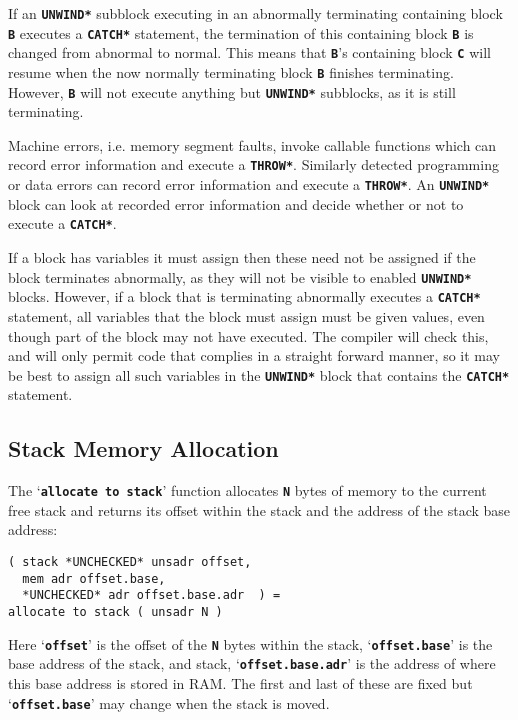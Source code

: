 \documentclass[12pt]{article}
\makeatletter
\newcommand{\TT}[1]{{\tt \bfseries #1}}
\newcommand{\ttkey}[1]{\TT{#1}\index{#1@{\tt #1}}}
\newenvironment{indpar}[1][0.3in]%
	{\begin{list}{}%
		     {\setlength{\itemsep}{0in}%
		      \setlength{\topsep}{0in}%
		      \setlength{\parsep}{1ex}%
		      \setlength{\labelwidth}{#1}%
		      \setlength{\leftmargin}{#1}%
		      \addtolength{\leftmargin}{\labelsep}}%
	 \item}%
	{\end{list}}
\makeatother
\begin{document}
If an \TT{*UNWIND*} subblock executing in an abnormally terminating
containing block \TT{B}
executes a \TT{*CATCH*} statement, the termination of this
containing block \TT{B}
is changed from abnormal to normal.  This means
that \TT{B}'s containing block \TT{C} will resume when the now
normally terminating block \TT{B} finishes terminating.
However, \TT{B} will not execute anything but \TT{*UNWIND*}
subblocks, as it is still terminating.

Machine errors, i.e. memory segment faults, invoke callable functions
which can record error information and execute a \TT{*THROW*}.
Similarly detected programming or data errors can record
error information and execute a \TT{*THROW*}.  An \TT{*UNWIND*}
block can look at recorded error information and decide whether
or not to execute a \TT{*CATCH*}.

If a block has variables it must assign then these need not be
assigned if the block terminates abnormally, as they will not
be visible to enabled \TT{*UNWIND*} blocks.  However, if a block
that is terminating abnormally executes a \TT{*CATCH*} statement,
all variables that the block must assign must be given values, even
though part of the block may not have executed.  The compiler
will check this, and will only permit code that complies in a
straight forward manner, so it may be best to assign all such
variables in the \TT{*UNWIND*} block that contains the \TT{*CATCH*}
statement.

\subsection{Stack Memory Allocation}
\label{STACK-MEMORY-ALLOCATION}

The `\ttkey{allocate to stack}' function allocates \TT{N} bytes of
memory to the current free stack and returns its offset within
the stack and the address of the stack base address:

\begin{indpar}\begin{verbatim}
( stack *UNCHECKED* unsadr offset,
  mem adr offset.base,
  *UNCHECKED* adr offset.base.adr  ) =
allocate to stack ( unsadr N )
\end{verbatim}\end{indpar}\label{ALLOCATE-TO-STACK}

Here `\TT{offset}' is the offset of the \TT{N} bytes within the
stack, `\TT{offset.base}' is the base address of the stack, and
stack, `\TT{offset.base.adr}' is the address of where this
base address is stored in RAM.  The first and last of these
are fixed but `\TT{offset.base}' may change when the stack is
moved.
\end{document}
